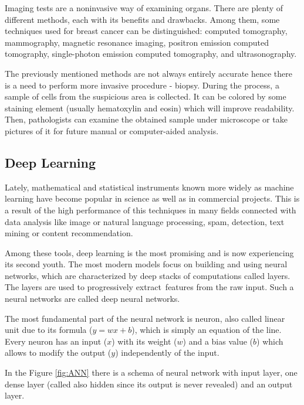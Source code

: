 \documentclass[12pt]{article}
\begin{document}
Imaging tests are a noninvasive way of examining organs. There are plenty of different methods, each with its benefits and drawbacks. Among them, some techniques used for breast cancer can be distinguished: computed tomography, mammography, magnetic resonance imaging, positron emission computed tomography, single-photon emission computed tomography, and ultrasonography\cite{5}.

The previously mentioned methods are not always entirely accurate hence there is a need to perform more invasive procedure - biopsy. During the process, a sample of cells from the suspicious area is collected. It can be colored by some staining element (usually hematoxylin and eosin) which will improve readability. Then, pathologists can examine the obtained sample under microscope or take pictures of it for future manual or computer-aided analysis\cite{1}.


\subsection{Deep Learning}
Lately, mathematical and statistical instruments known more widely as machine learning have become popular in science as well as in commercial projects. This is a result of the high performance of this techniques in many fields connected with data analysis like image or natural language processing, spam, detection, text mining or content recommendation\cite{6}.

Among these tools, deep learning is the most promising and is now experiencing its second youth. The most modern models focus on building and using neural networks, which are characterized by deep stacks of computations called layers. The layers are used to progressively extract features from the raw input. Such a neural networks are called deep neural networks\cite{6}.

The most fundamental part of the neural network is neuron, also called linear unit due to its formula ($y = wx + b$), which is simply an equation of the line. Every neuron has an input ($x$) with its weight ($w$) and a bias value ($b$) which allows to modify the output ($y$) independently of the input\cite{7}.

In the Figure \ref{fig:ANN} there is a schema of neural network with input layer, one dense layer (called also hidden since its output is never revealed)  and an output layer\cite{7}.
\end{document}

